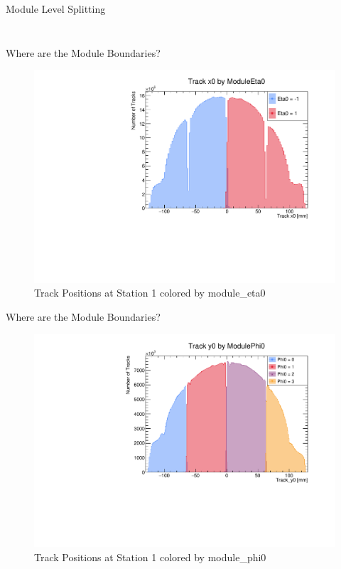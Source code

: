 \begin{frame}{Module Level Splitting}
\begin{columns}
\begin{column}{0.2\linewidth}
\begin{figure}
            \end{figure}
        \end{column}
    \end{columns}
\end{frame}

\begin{frame}{Where are the Module Boundaries?}
    \begin{figure}
        \includegraphics[width=\linewidth]{./ModuleLevelPlots/Track_x0_eta0.pdf}
        \caption{Track Positions at Station 1 colored by module\_eta0}
    \end{figure}
\end{frame}
\begin{frame}{Where are the Module Boundaries?}
    \begin{figure}
        \includegraphics[width=\linewidth]{./ModuleLevelPlots/Track_y0_phi0.pdf}
        \caption{Track Positions at Station 1 colored by module\_phi0}
    \end{figure}
\end{frame}


